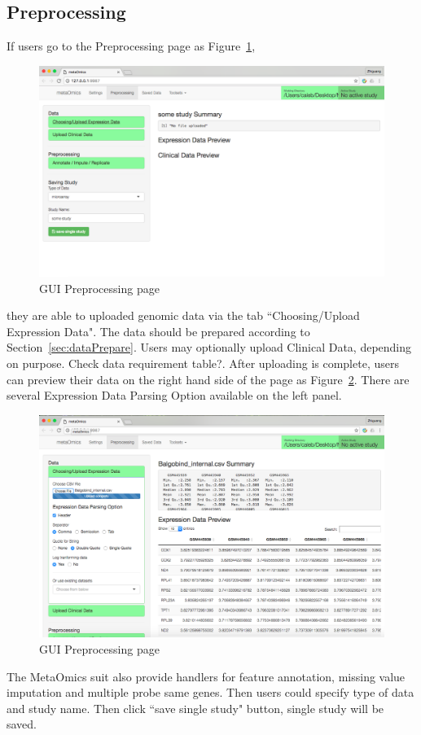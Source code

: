\documentclass{article}
\begin{document}
\subsection{Preprocessing}
If users go to the Preprocessing page as Figure~\ref{fig:GUIpreprocessing},
\begin{figure}[!htbp]
\begin{center}
\includegraphics[scale=0.35]{./figure/GUIpreprocessing}
\caption{GUI Preprocessing page}
\label{fig:GUIpreprocessing}
\end{center}
\end{figure}
they are able to uploaded genomic data via the tab ``Choosing/Upload Expression Data".
The data should be prepared according to Section~\ref{sec:dataPrepare}.
Users may optionally upload Clinical Data, depending on purpose.
{
\color{red}
Check data requirement table?.
}
After uploading is complete,
users can preview their data on the right hand side of the page as Figure~\ref{fig:GUIpreview}.
There are several Expression Data Parsing Option available on the left panel.
\begin{figure}[H]
\begin{center}
\includegraphics[scale=0.35]{./figure/GUIpreview}
\caption{GUI Preprocessing page}
\label{fig:GUIpreview}
\end{center}
\end{figure}
The MetaOmics suit also provide handlers for feature annotation, missing value imputation and multiple probe same genes.
Then users could specify type of data and study name.
Then click ``save single study" button, single study will be saved.
\end{document}
